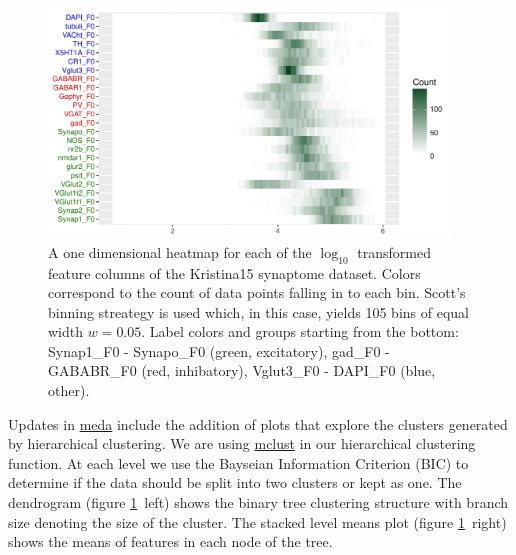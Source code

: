 \documentclass[simplex.tex]{subfiles}
\begin{document}
\begin{figure}[!h]
\begin{cframed}
\centering
\includegraphics[width=0.95\textwidth]{../../figs/201701-meda-1dheat.pdf}
\caption{A one dimensional heatmap for each of the $\log_{10}$
  transformed feature columns of the Kristina15 synaptome dataset.
  Colors correspond to the count of data points falling in to each bin.
  Scott's binning streategy is used which, in this case, yields 105 bins
  of equal width $w = 0.05$. 
  Label colors and groups starting from the bottom:
  \textcolor{jgreen}{Synap1\_F0 - Synapo\_F0 (green, excitatory)},
  \textcolor{jred}{gad\_F0 - GABABR\_F0 (red, inhibatory)},
  \textcolor{jblue}{Vglut3\_F0 - DAPI\_F0 (blue, other)}.
  }
\label{fig:meda}
\end{cframed}
\end{figure}

\clearpage


Updates in \href{https://github.com/neurodata/meda}{meda} include the
addition of plots that explore the clusters generated by
hierarchical clustering.  We are using 
\href{http://www.stat.washington.edu/fraley/mclust/}{mclust}
in our
hierarchical clustering function.  At each level we use the Bayseian
Information Criterion (BIC) to determine if the data should be split
into two clusters or kept as one.  The dendrogram 
(figure \ref{fig:meda}~left)
shows the binary tree clustering structure with branch size denoting the
size of the cluster.  The stacked level means plot
(figure \ref{fig:meda}~right) shows the means of features in each node 
of the tree.


\end{document}
